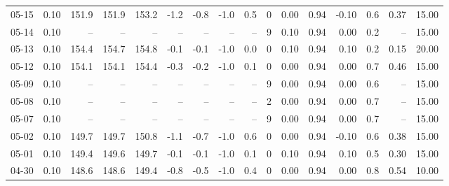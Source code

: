 \begin{threeparttable}
{\begin{tabular}{lrrrrrrrrrrrrrrr}
  05-15 &     0.10 & 151.9 & 151.9 & 153.2 &       -1.2 &           -0.8 &                     -1.0 &                 0.5 &              0 &       0.00 &      0.94 &          -0.10 &              0.6 &            0.37 &                  15.00 \\
  05-14 &     0.10 &    -- &    -- &    -- &         -- &             -- &                       -- &                  -- &              9 &       0.10 &      0.94 &           0.00 &              0.2 &              -- &                  15.00 \\
  05-13 &     0.10 & 154.4 & 154.7 & 154.8 &       -0.1 &           -0.1 &                     -1.0 &                 0.0 &              0 &       0.10 &      0.94 &           0.10 &              0.2 &            0.15 &                  20.00 \\
  05-12 &     0.10 & 154.1 & 154.1 & 154.4 &       -0.3 &           -0.2 &                     -1.0 &                 0.1 &              0 &       0.00 &      0.94 &           0.00 &              0.7 &            0.46 &                  15.00 \\
  05-09 &     0.10 &    -- &    -- &    -- &         -- &             -- &                       -- &                  -- &              9 &       0.00 &      0.94 &           0.00 &              0.6 &              -- &                  15.00 \\
  05-08 &     0.10 &    -- &    -- &    -- &         -- &             -- &                       -- &                  -- &              2 &       0.00 &      0.94 &           0.00 &              0.7 &              -- &                  15.00 \\
  05-07 &     0.10 &    -- &    -- &    -- &         -- &             -- &                       -- &                  -- &              9 &       0.00 &      0.94 &           0.00 &              0.7 &              -- &                  15.00 \\
  05-02 &     0.10 & 149.7 & 149.7 & 150.8 &       -1.1 &           -0.7 &                     -1.0 &                 0.6 &              0 &       0.00 &      0.94 &          -0.10 &              0.6 &            0.38 &                  15.00 \\
  05-01 &     0.10 & 149.4 & 149.6 & 149.7 &       -0.1 &           -0.1 &                     -1.0 &                 0.1 &              0 &       0.10 &      0.94 &           0.10 &              0.5 &            0.30 &                  15.00 \\
  04-30 &     0.10 & 148.6 & 148.6 & 149.4 &       -0.8 &           -0.5 &                     -1.0 &                 0.4 &              0 &       0.00 &      0.94 &           0.00 &              0.8 &            0.54 &                  10.00 \\

\end{tabular}}
\end{threeparttable}
